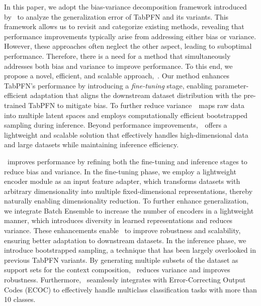 In this paper, we adopt the bias-variance decomposition framework introduced by~\citet{SF_PFN} to analyze the generalization error of TabPFN and its variants. This framework allows us to revisit and categorize existing methods, revealing that performance improvements typically arise from addressing either bias or variance. However, these approaches often neglect the other aspect, leading to suboptimal performance.  
Therefore, there is a need for a method that simultaneously addresses both bias and variance to improve performance. 
To this end, we propose a novel, efficient, and scalable approach,~\name. Our method enhances TabPFN’s performance by introducing a \textit{fine-tuning} stage, enabling parameter-efficient adaptation that aligns the downstream dataset distribution with the pre-trained TabPFN to mitigate bias. To further reduce variance~\name~maps raw data into multiple latent spaces and employs computationally efficient bootstrapped sampling during inference. Beyond performance improvements,~\name~offers a lightweight and scalable solution that effectively handles high-dimensional data and large datasets while maintaining inference efficiency.


\name~improves performance by refining both the fine-tuning and inference stages to 
reduce bias and variance. In the fine-tuning phase, we employ a lightweight encoder module as an input feature adapter, which transforms datasets with arbitrary dimensionality into multiple fixed-dimensional representations, thereby naturally enabling dimensionality reduction. To further enhance generalization, we integrate Batch Ensemble \cite{WenTB20BatchEnsemble,Yury2024TabM} to increase the number of encoders in a lightweight manner, which introduces diversity in learned representations and reduces variance. These enhancements enable \name~to improve robustness and scalability, ensuring better adaptation to downstream datasets. 
In the inference phase, we introduce bootstrapped sampling, a technique that has been largely overlooked in previous TabPFN variants. By generating multiple subsets of the dataset as support sets for the context composition, \name~reduces variance and improves robustness. Furthermore, \name~seamlessly integrates with Error-Correcting Output Codes (ECOC) to effectively handle multiclass classification tasks with more than 10 classes.

